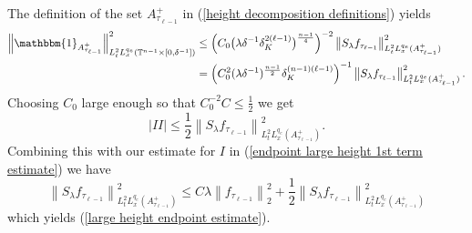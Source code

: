 \documentclass[11pt]{amsart}
\numberwithin{equation}{section}
\newcommand{\Tn}{\mathbb{T}^{n-1}}
\newcommand{\la}{\lambda}
\newcommand\norm[1]{\left\lVert#1\right\rVert}
\newcommand{\altlpnorm}[2]{\norm{#1}_{#2}}
\newcommand{\mixlpnorm}[4]{\norm{#1}_{L^{#2}_{t} L^{#3}_{x}(#4)}}
\newcommand{\Sl}{S_{\la}}
\begin{document}
The definition of the set $A^{+}_{\tau_{\ell - 1}}$ in (\ref{height decomposition definitions}) yields
\begin{equation}
\begin{split}
    \mixlpnorm{\mathbbm{1}_{A^{+}_{\tau_{\ell - 1}}}}{2}{q_e}{\Tn \times [0,\delta^{-1}]}^2 &\leq \Big(C_0\big(\la \delta^{-1}\delta_{K}^{2(\ell - 1)}\big)^{\frac{n-1}{4}}\Big)^{-2} \mixlpnorm{\Sl f_{\tau_{\ell - 1}}}{2}{q_e}{A^{+}_{\tau_{\ell - 1}}}^2 \\
    &= \Big(C_0^2 (\la \delta^{-1})^{\frac{n-1}{2}}\delta_{K}^{(n-1)(\ell - 1)}\Big)^{-1}\mixlpnorm{\Sl f_{\tau_{\ell - 1}}}{2}{q_e}{A^{+}_{\tau_{\ell - 1}}}^2.
\end{split}
\end{equation}
Choosing $C_0$ large enough so that $C_0^{-2}C \leq \frac{1}{2}$ we get 
\begin{equation}
    \big| II \big| \leq \frac{1}{2}\mixlpnorm{\Sl f_{\tau_{\ell - 1}}}{2}{q_e}{A^{+}_{\tau_{\ell - 1}}}^2.
\end{equation}
Combining this with our estimate for $I$ in (\ref{endpoint large height 1st term estimate}) we have
\begin{equation}
    \mixlpnorm{\Sl f_{\tau_{\ell - 1}}}{2}{q_e}{A^{+}_{\tau_{\ell - 1}}}^2 \leq C \la \altlpnorm{f_{\tau_{\ell - 1}}}{2}^2 + \frac{1}{2}\mixlpnorm{\Sl f_{\tau_{\ell  -1}}}{2}{q_e}{A^{+}_{\tau_{\ell - 1}}}^2
\end{equation}
which yields (\ref{large height endpoint estimate}).
\end{document}
